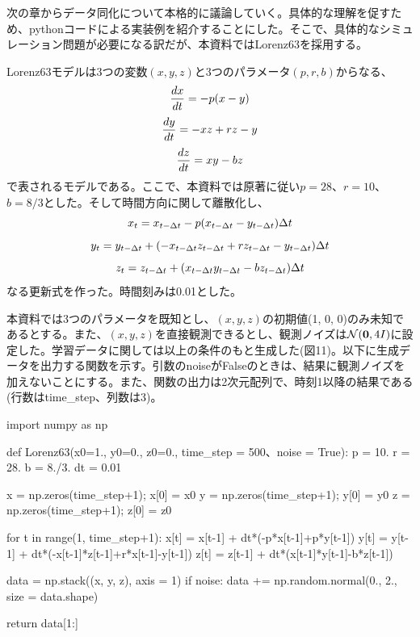 \documentclass[dvipdfmx, 9pt, a4paper]{jsarticle}
\newcommand{\bm}[1]{{\mbox{\boldmath $#1$}}}
\begin{document}
次の章からデータ同化について本格的に議論していく。具体的な理解を促すため、pythonコードによる実装例を紹介することにした。そこで、具体的なシミュレーション問題が必要になる訳だが、本資料ではLorenz63を採用する。\par
Lorenz63モデルは3つの変数$(x, y, z)$と3つのパラメータ$(p, r, b)$からなる、
\begin{equation}
\frac{dx}{dt}=-p(x-y) \notag
\end{equation}
\begin{equation}
\frac{dy}{dt}=-xz+rz-y \notag
\end{equation}
\begin{equation}
\frac{dz}{dt}=xy-bz \notag
\end{equation}
で表されるモデルである。ここで、本資料では原著に従い$p=28$、$r=10$、$b=8/3$とした。そして時間方向に関して離散化し、
\begin{equation}
x_t=x_{t-\Delta t} -p(x_{t-\Delta t}-y_{t-\Delta t})\Delta t \notag
\end{equation}
\begin{equation}
y_t=y_{t-\Delta t}+(-x_{t-\Delta t}z_{t-\Delta t}+rz_{t-\Delta t}-y_{t-\Delta t})\Delta t \notag
\end{equation}
\begin{equation}
z_t= z_{t-\Delta t}+(x_{t-\Delta t}y_{t-\Delta t}-bz_{t-\Delta t})\Delta t \notag
\end{equation}
なる更新式を作った。時間刻みは0.01とした。\par
本資料では3つのパラメータを既知とし、$(x, y, z)$の初期値(1, 0, 0)のみ未知であるとする。また、$(x, y, z)$を直接観測できるとし、観測ノイズは$\mathcal{N}(\bm 0, 4I)$に設定した。学習データに関しては以上の条件のもと生成した(図11)。以下に生成データを出力する関数を示す。引数のnoiseがFalseのときは、結果に観測ノイズを加えないことにする。また、関数の出力は2次元配列で、時刻1以降の結果である(行数はtime\_step、列数は3)。\bigskip
\begin{python}
import numpy as np

def Lorenz63(x0=1., y0=0., z0=0., time_step = 500、noise = True):
	p = 10.
	r = 28.
	b = 8./3.
	dt = 0.01

	x = np.zeros(time_step+1); x[0] = x0
	y = np.zeros(time_step+1); y[0] = y0
	z = np.zeros(time_step+1); z[0] = z0

	for t in range(1, time_step+1):
		x[t] = x[t-1] + dt*(-p*x[t-1]+p*y[t-1])
		y[t] = y[t-1] + dt*(-x[t-1]*z[t-1]+r*x[t-1]-y[t-1])
		z[t] = z[t-1] + dt*(x[t-1]*y[t-1]-b*z[t-1])

	data = np.stack((x, y, z), axis = 1)
	if noise:
		data += np.random.normal(0., 2., size = data.shape)

	return data[1:]
\end{python}
\end{document}
